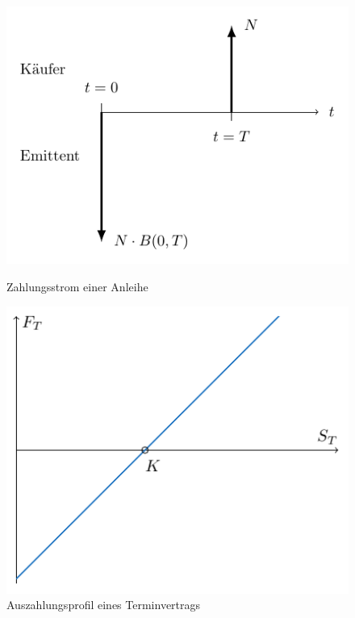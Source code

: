 \begin{enumerate}[leftmargin=*, label=(\alph*)]
	\begin{figure}
		\centering
		\begin{minipage}[t]{\dimexpr0.45\linewidth-\fboxrule-\fboxsep}
			\centering
			\includegraphics[width=\textwidth]{./img/zahlungsstrom-anleihe}
			\caption{Zahlungsstrom einer Anleihe}
			\label{fig: zahlungsstromAnleihe}
		\end{minipage}
		\begin{minipage}[t]{\dimexpr0.5\linewidth-\fboxrule-\fboxsep}
			\centering
			\includegraphics[width=.9\textwidth]{img/terminvertrag}
			\caption{Auszahlungsprofil eines Terminvertrags}
			\label{fig: terminvertrag}
		\end{minipage}
	\end{figure}
	

\end{enumerate}
